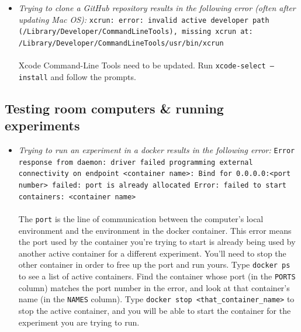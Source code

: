 \documentclass{tufte-book} %
\begin{document}
\begin{itemize}
\item \textit{Trying to clone a GitHub repository results in the following error (often after updating Mac OS): } \linebreak
{\tt xcrun: error: invalid active developer path \linebreak
(/Library/Developer/CommandLineTools), missing xcrun at: /Library/Developer/CommandLineTools/usr/bin/xcrun}
\\~\\
Xcode Command-Line Tools need to be updated.  Run \linebreak 
{\tt xcode-select ---install} and follow the prompts.

\end{itemize}

\subsection{Testing room computers \& running experiments}

\begin{itemize}
\item \textit{Trying to run an experiment in a docker results in the following error:} \linebreak
{\tt Error response from daemon: driver failed programming external connectivity on endpoint <container name>: Bind for 0.0.0.0:<port number> failed: port is already allocated \linebreak
Error: failed to start containers: <container name>} 
\\~\\
The {\tt port} is the line of communication between the computer's local environment and the environment in the docker container. This error means the port used by the container you're trying to start is already being used by another active container for a different experiment. You'll need to stop the other container in order to free up the port and run yours. Type {\tt docker ps} to see a list of active containers. Find the container whose port (in the {\tt PORTS} column) matches the port number in the error, and look at that container's name (in the {\tt NAMES} column). Type {\tt docker stop \textless that\_container\_name\textgreater} to stop the active container, and you will be able to start the container for the experiment you are trying to run.

\end{itemize}
\end{document}
